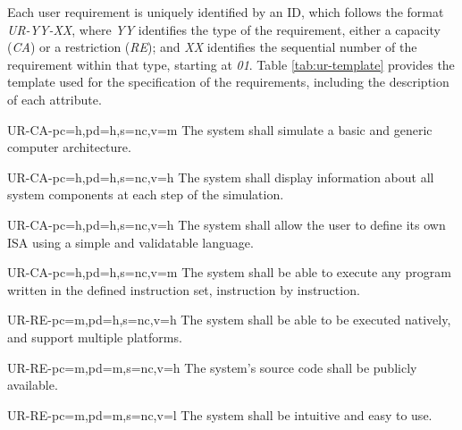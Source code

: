 Each user requirement is uniquely identified by an ID, which follows the format \textit{UR-YY-XX}, where \textit{YY} identifies the type of the requirement, either a capacity (\textit{CA}) or a restriction (\textit{RE}); and \textit{XX} identifies the sequential number of the requirement within that type, starting at \textit{01}. Table \ref{tab:ur-template} provides the template used for the specification of the requirements, including the description of each attribute.




\setcounter{i}{1}

\begin{userReq}{UR-CA-}{pc=h,pd=h,s=nc,v=m}
  The system shall simulate a basic and generic computer architecture.
\end{userReq}

\begin{userReq}{UR-CA-}{pc=h,pd=h,s=nc,v=h}
  The system shall display information about all system components at each step of the simulation.
\end{userReq}

\begin{userReq}{UR-CA-}{pc=h,pd=h,s=nc,v=h}
  The system shall allow the user to define its own \gls{ISA} using a simple and validatable language.
\end{userReq}

\begin{userReq}{UR-CA-}{pc=h,pd=h,s=nc,v=m}
  The system shall be able to execute any program written in the defined instruction set, instruction by instruction.
\end{userReq}



\setcounter{i}{1}

\begin{userReq}{UR-RE-}{pc=m,pd=h,s=nc,v=h}
  The system shall be able to be executed natively, and support multiple platforms.
\end{userReq}

\begin{userReq}{UR-RE-}{pc=m,pd=m,s=nc,v=h}
  The system's source code shall be publicly available.
\end{userReq}

\begin{userReq}{UR-RE-}{pc=m,pd=m,s=nc,v=l}
  The system shall be intuitive and easy to use.
\end{userReq}

